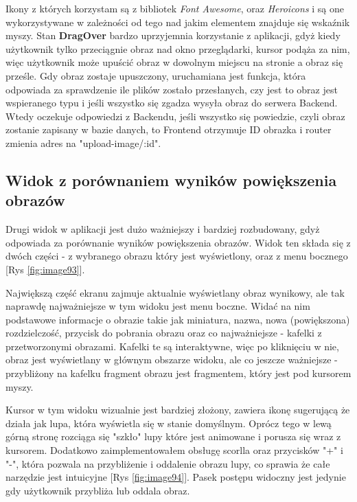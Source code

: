 Ikony z których korzystam są z bibliotek \textit{Font Awesome}, oraz \textit{Heroicons} i są one wykorzystywane w zależności od tego nad jakim elementem znajduje się wskaźnik myszy.
Stan \textbf{DragOver} bardzo uprzyjemnia korzystanie z aplikacji, gdyż kiedy użytkownik tylko przeciągnie obraz nad okno przeglądarki, kursor podąża za nim, więc użytkownik może upuścić obraz w dowolnym miejscu na stronie a obraz się prześle.
\newpage
Gdy obraz zostaje upuszczony, uruchamiana jest funkcja, która odpowiada za sprawdzenie ile plików zostało przesłanych, czy jest to obraz jest wspieranego typu i jeśli wszystko się zgadza wysyła obraz do serwera Backend. Wtedy oczekuje odpowiedzi z Backendu, jeśli wszystko się powiedzie, czyli obraz zostanie zapisany w bazie danych, to Frontend otrzymuje ID obrazka i router zmienia adres na "upload-image/:id". 



\subsection*{Widok z porównaniem wyników powiększenia obrazów}

Drugi widok w aplikacji jest dużo ważniejszy i bardziej rozbudowany, gdyż odpowiada za porównanie wyników powiększenia obrazów. Widok ten składa się z dwóch części - z wybranego obrazu który jest wyświetlony, oraz z menu bocznego [Rys \ref{fig:image93}].

Największą część ekranu zajmuje aktualnie wyświetlany obraz wynikowy, ale tak naprawdę najważniejsze w tym widoku jest menu boczne. Widać na nim podstawowe informacje o obrazie takie jak miniatura, nazwa, nowa (powiększona) rozdzielczość, przycisk do pobrania obrazu oraz co najważniejsze - kafelki z przetworzonymi obrazami. Kafelki te są interaktywne, więc po kliknięciu w nie, obraz jest wyświetlany w głównym obszarze widoku, ale co jeszcze ważniejsze - przybliżony na kafelku fragment obrazu jest fragmentem, który jest pod kursorem myszy. 

Kursor w tym widoku wizualnie jest bardziej złożony, zawiera ikonę sugerującą że działa jak lupa, która wyświetla się w stanie domyślnym. Oprócz tego w lewą górną stronę rozciąga się "szkło" lupy które jest animowane i porusza się wraz z kursorem. 
Dodatkowo zaimplementowałem obsługę scorlla oraz przycisków "+" i "-", która pozwala na przybliżenie i oddalenie obrazu lupy, co sprawia że całe narzędzie jest intuicyjne [Rys \ref{fig:image94}]. Pasek postępu widoczny jest jedynie gdy użytkownik przybliża lub oddala obraz. 

